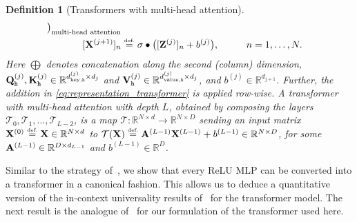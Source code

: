 \documentclass{article}
\newtheorem{definition}{Definition}[section]
\newtheorem{proposition}{Proposition}[section]
\newcommand{\eqdef }{\ensuremath{\stackrel{\mbox{\upshape\tiny def.}}{=}}}
\begin{document}
\begin{definition}[Transformers with multi-head attention]
\begin{alignat}{2}
{            \big)
    }_{\text{multi-head attention}} && \\
    \label{eq:representation_transformer} [\mathbf{X}^{(j+1)}]_n
    &\eqdef  
        \sigma\bullet
        \big(
            [\mathbf{Z}^{(j)}]_n + b^{(j)}
        \big),
    &&\qquad n=1,\dots,N.
\end{alignat}
Here $\bigoplus$ denotes concatenation along the second (column) dimension, $
{\bf Q}_{\mathtt{h}}^{(j)},{\bf K}_{\mathtt{h}}^{(j)}\in \mathbb{R}^{d_{{\rm key}, \mathtt{h}}^{(j)}\times d_j}$ and 
$
{\bf V}_{\mathtt{h}}^{(j)}\in \mathbb{R}^{d_{{\rm value}, \mathtt{h}}^{(j)}\times d_j}$, and $b^{(j)}\in\mathbb{R}^{d_{j+1}}$.
Further, the addition in \eqref{eq:representation_transformer} is applied row-wise.
A \emph{transformer with multi-head attention} with depth $L$, obtained by composing the layers $\mathcal{T}_0,\mathcal{T}_1,\dots,\mathcal{T}_{L-2}$, is a map $\mathcal{T}:\mathbb{R}^{N\times d}\to\mathbb{R}^{N\times D}$ sending an input matrix ${\bf X}^{(0)}\eqdef {\bf X}\in\mathbb{R}^{N\times d}$ to $\mathcal{T}({\bf X}) \eqdef {\bf A}^{(L-1)}{\bf X}^{(L-1)} + b^{(L-1)}\in\mathbb{R}^{N\times D}$, for some ${\bf A}^{(L-1)}\in\mathbb{R}^{D\times d_{L-1}}$ and $b^{(L-1)}\in\mathbb{R}^D$.
\end{definition}


Similar to the strategy of~\cite{petersen2020equivalence}, we 
show that every ReLU MLP can be converted into a transformer in a canonical fashion. 
This allows us to deduce a quantitative version of the in-context universality results of~\cite{furuya2025transformers} for the transformer model. 
The next result is the analogue of~\cite[Proposition 11]{kratsios2025context} for our formulation of the transformer used here. 




\end{document}
